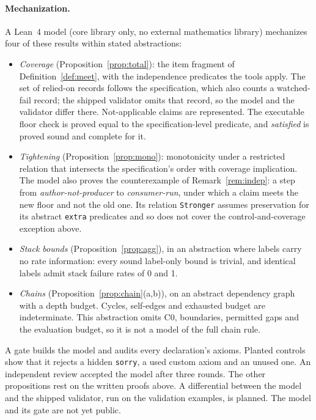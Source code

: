 \documentclass[11pt]{article}
\theoremstyle{definition}
\theoremstyle{remark}
\begin{document}
\paragraph{Mechanization.} A Lean~4 model (core library only, no external mathematics library)
mechanizes four of these results within stated abstractions:
\begin{itemize}[itemsep=1pt]
\item \emph{Coverage} (Proposition~\ref{prop:total}): the item fragment of
  Definition~\ref{def:meet}, with the independence predicates the tools apply. The set of relied-on
  records follows the specification, which also counts a watched-fail record; the shipped validator
  omits that record, so the model and the validator differ there. Not-applicable claims are
  represented. The executable floor check is proved equal to the specification-level predicate,
  and \emph{satisfied} is proved sound and complete for it.
\item \emph{Tightening} (Proposition~\ref{prop:mono}): monotonicity under a restricted relation that
  intersects the specification's order with coverage implication. The model also proves the
  counterexample of Remark~\ref{rem:indep}: a step from \emph{author-not-producer} to
  \emph{consumer-run}, under which a claim meets the new floor and not the old one. Its relation
  \texttt{Stronger} assumes preservation for its abstract \texttt{extra} predicates and so does not
  cover the control-and-coverage exception above.
\item \emph{Stack bounds} (Proposition~\ref{prop:agg}), in an abstraction where labels carry no rate
  information: every sound label-only bound is trivial, and identical labels admit stack failure
  rates of 0 and 1.
\item \emph{Chains} (Proposition~\ref{prop:chain}(a,b)), on an abstract dependency graph with a depth
  budget. Cycles, self-edges and exhausted budget are indeterminate. This abstraction omits C0,
  boundaries, permitted gaps and the evaluation budget, so it is not a model of the full chain
  rule.
\end{itemize}
A gate builds the model and audits every declaration's axioms. Planted controls show that it
rejects a hidden \texttt{sorry}, a used custom axiom and an unused one. An independent review
accepted the model after three rounds. The other propositions rest on the written proofs above. A
differential between the model and the shipped validator, run on the validation examples, is
planned. The model and its gate are not yet public.
\end{document}
